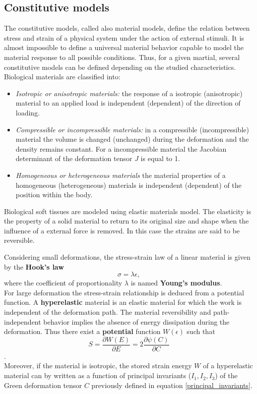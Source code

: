 \subsection{Constitutive models}\label{subsection:constitutivemodels}
   The constitutive models, called also material models, define the relation between stress and strain of a physical system under the action of external stimuli. It is almost impossible to define a universal material behavior capable to model the material response to all possible conditions. Thus, for a given martial, several constitutive models can be defined depending on the studied characteristics. \\
	Biological materials are classified into:
	\begin{itemize}
\item \textit{ Isotropic or anisotropic materials:} the response of a isotropic (anisotropic) material to an applied load is independent (dependent) of the direction of loading.
\item\textit{ Compressible or incompressible materials:} in a compressible (incompressible) material the volume is changed (unchanged) during the deformation and the density remains constant. For a incompressible material the Jacobian determinant of the deformation tensor $J$ is equal to 1. 
\item \textit{ Homogeneous or heterogeneous materials} the material properties of a homogeneous (heterogeneous) materials is independent (dependent) of the position within the body.
	\end{itemize}

Biological soft tissues are modeled using elastic materials model. The elasticity is the property of a solid material to return to its original size and shape when the influence of a external force is removed. In this case the strains are said to be reversible. 
	 
Considering small deformations, the stress-strain law of a linear material is given by the \textbf{Hook's law} $$\sigma = \lambda \epsilon,$$ where  the coefficient of proportionality $\lambda$ is named \textbf{Young's modulus}. \\
For large deformation the stress-strain relationship is deduced from a potential function. A \textbf{hyperelastic} material is an elastic material for which the work is independent of the deformation path. The material reversibility and path-independent behavior implies the absence of energy dissipation during the deformation. Thus there exist a \textbf{potential} function $W(\epsilon)$ such that $$S = \frac{\partial W(E)}{\partial E}= 2\frac{\partial \psi (C)}{\partial C}$$.\\
Moreover, if the material is isotropic, the stored strain energy $W$ of a hyperelastic material can by written as a function of principal invariants ($I_1, I_2, I_3$) of the Green deformation tensor $C$ previously defined in equation \ref{principal_invariants}.

